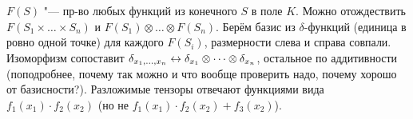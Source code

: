\section{} %
$F(S)$ "--- пр-во любых функций из конечного $S$ в поле $K$.
Можно отождествить $F(S_1 \times \dots \times S_n)$ и $F(S_1) \otimes \dots \otimes F(S_n)$.
Берём базис из $\delta$-функций (единица в ровно одной точке) для каждого $F(S_i)$, размерности слева и справа совпали.
Изоморфизм сопоставит $\delta_{x_1, \dots, x_n} \leftrightarrow \delta_{x_1} \otimes \dots \otimes \delta_{x_n}$,
остальное по аддитивности (\TODO поподробнее, почему так можно и что вообще проверить надо, почему хорошо от базисности?).
Разложимые тензоры отвечают функциями вида $f_1(x_1) \cdot f_2(x_2)$ (но не $f_1(x_1)\cdot f_2(x_2) + f_3(x_2)$).

\section{} %

\section{} %

\section{} %

\section{} %

\section{} %

